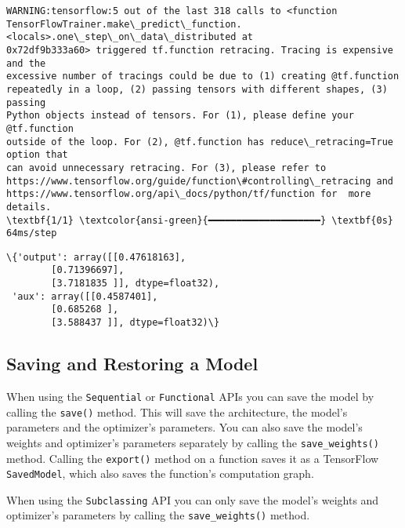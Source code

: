 \documentclass[12pt letter]{report}
\makeatletter
\newcommand{\boxspacing}{\kern\kvtcb@left@rule\kern\kvtcb@boxsep}
\newcommand{\prompt}[4]{
        {\ttfamily\llap{{\color{#2}[#3]:\hspace{3pt}#4}}\vspace{-\baselineskip}}
    }
\makeatother
\begin{document}
    \begin{Verbatim}[commandchars=\\\{\}]
WARNING:tensorflow:5 out of the last 318 calls to <function
TensorFlowTrainer.make\_predict\_function.<locals>.one\_step\_on\_data\_distributed at
0x72df9b333a60> triggered tf.function retracing. Tracing is expensive and the
excessive number of tracings could be due to (1) creating @tf.function
repeatedly in a loop, (2) passing tensors with different shapes, (3) passing
Python objects instead of tensors. For (1), please define your @tf.function
outside of the loop. For (2), @tf.function has reduce\_retracing=True option that
can avoid unnecessary retracing. For (3), please refer to
https://www.tensorflow.org/guide/function\#controlling\_retracing and
https://www.tensorflow.org/api\_docs/python/tf/function for  more details.
\textbf{1/1} \textcolor{ansi-green}{━━━━━━━━━━━━━━━━━━━━} \textbf{0s} 64ms/step
    \end{Verbatim}

            \begin{tcolorbox}[breakable, size=fbox, boxrule=.5pt, pad at break*=1mm, opacityfill=0]
\prompt{Out}{outcolor}{ }{\boxspacing}
\begin{Verbatim}[commandchars=\\\{\}]
\{'output': array([[0.47618163],
        [0.71396697],
        [3.7181835 ]], dtype=float32),
 'aux': array([[0.4587401],
        [0.685268 ],
        [3.588437 ]], dtype=float32)\}
\end{Verbatim}
\end{tcolorbox}
        
\subsection{Saving and Restoring a
Model}\label{saving-and-restoring-a-model}

When using the \texttt{Sequential} or \texttt{Functional} APIs you can
save the model by calling the \texttt{save()} method. This will save the
architecture, the model's parameters and the optimizer's parameters. You
can also save the model's weights and optimizer's parameters separately
by calling the \texttt{save\_weights()} method. Calling the
\texttt{export()} method on a function saves it as a TensorFlow
\texttt{SavedModel}, which also saves the function's computation graph.

When using the \texttt{Subclassing} API you can only save the model's
weights and optimizer's parameters by calling the
\texttt{save\_weights()} method.
\end{document}
